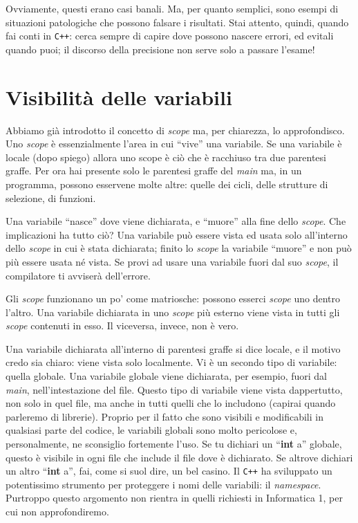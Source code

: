 	
	Ovviamente, questi erano casi banali. Ma, per quanto semplici, sono esempi di situazioni patologiche che possono falsare i risultati.  Stai attento, quindi, quando fai conti in \verb|C++|: cerca sempre di capire  dove possono nascere errori, ed evitali quando puoi; il discorso della precisione non serve solo a passare l'esame! 
	\section{Visibilità delle variabili}
	Abbiamo già introdotto il concetto di \emph{scope} ma, per chiarezza, lo approfondisco. Uno \emph{scope} è essenzialmente l'area in cui ``vive'' una variabile. Se una variabile è locale (dopo spiego) allora uno scope è ciò che è racchiuso tra due parentesi graffe. Per ora hai presente solo le parentesi graffe del \emph{main} ma, in un programma, possono esservene molte altre: quelle dei cicli, delle strutture di selezione, di funzioni. 
	
	Una variabile ``nasce'' dove viene dichiarata, e ``muore'' alla fine dello \emph{scope}. Che implicazioni ha tutto ciò? Una variabile può essere vista ed usata solo all'interno dello \emph{scope} in cui è stata dichiarata; finito lo \emph{scope} la variabile ``muore'' e non può più essere usata né  vista. Se provi ad usare una variabile fuori dal suo \emph{scope}, il compilatore ti avviserà dell'errore. 
	
	Gli \emph{scope} funzionano un po' come matriosche: possono esserci \emph{scope} uno dentro l'altro. Una variabile dichiarata in uno \emph{scope} più esterno viene vista in tutti gli \emph{scope} contenuti in esso. Il viceversa, invece, non è vero. 
	
	Una variabile dichiarata all'interno di parentesi graffe si dice locale, e il motivo credo sia chiaro: viene vista solo localmente. Vi è un secondo tipo di variabile: quella globale. Una variabile globale viene dichiarata, per esempio, fuori dal \emph{main}, nell'intestazione del file. Questo tipo di variabile viene vista dappertutto, non solo in quel file, ma anche in tutti quelli che lo includono (capirai quando parleremo di librerie). Proprio per il fatto che sono visibili e modificabili in qualsiasi parte del codice, le variabili globali sono molto pericolose e, personalmente, ne sconsiglio fortemente l'uso. Se tu dichiari un ``\textbf{int} a'' globale, questo è visibile in ogni file che include il file dove è dichiarato. Se altrove dichiari un altro ``\textbf{int} a'', fai, come si suol dire, un bel casino. Il \verb|C++| ha sviluppato un potentissimo strumento per proteggere i nomi delle variabili: il \emph{namespace}. Purtroppo questo argomento non rientra in quelli richiesti in Informatica 1, per cui non approfondiremo.
	\\
	
